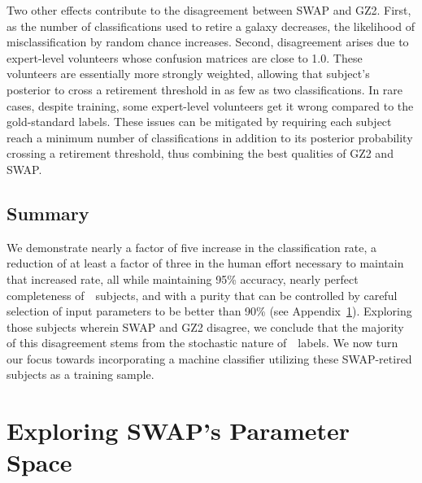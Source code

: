Two other effects contribute to the disagreement between SWAP and GZ2. First, as the number of classifications used to retire a galaxy decreases, the likelihood of misclassification by random chance increases. Second, disagreement arises due to expert-level volunteers whose confusion matrices are close to 1.0. These volunteers are essentially more strongly weighted, allowing that subject's posterior to cross a retirement threshold in as few as two classifications. In rare cases, despite training, some expert-level 
volunteers get it wrong compared to the gold-standard labels. These issues can be mitigated by requiring each subject reach a minimum number of classifications in addition to its posterior probability crossing a retirement threshold, thus combining the best qualities of GZ2 and SWAP. 


\subsection{Summary}



We demonstrate nearly a factor of five increase in the classification rate, a reduction of at least a factor of three in the human effort necessary to maintain that increased rate, all while maintaining 95\% accuracy, nearly perfect completeness of~\feat~subjects, and with a purity that can be controlled by careful selection of input parameters to be better than 90\% (see Appendix~\ref{sec: tweaking swap}). Exploring those subjects wherein SWAP and GZ2 disagree, we conclude that the majority of this disagreement stems from the stochastic nature of~\raw~labels. We now turn our focus towards incorporating a machine classifier utilizing these SWAP-retired subjects as a training sample. 


\section{Exploring SWAP's Parameter Space} \label{sec: tweaking swap}

